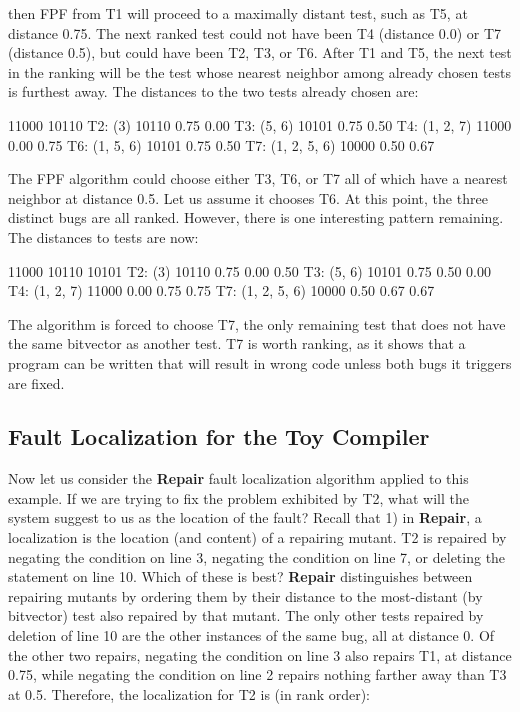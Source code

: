 \noindent then FPF from T1 will proceed to a maximally distant
test, such as T5, at distance 0.75.  The next ranked test could not have
been T4 (distance 0.0) or T7 (distance 0.5), but could have
been T2, T3, or T6.  After T1 and T5, the next test in the ranking will be the test whose nearest
neighbor among already chosen tests is furthest away.  The distances
to the two tests already chosen are:

\begin{code}
                         11000  10110
T2: (3)          10110   0.75   0.00
T3: (5, 6)       10101   0.75   0.50
T4: (1, 2, 7)    11000   0.00   0.75
T6: (1, 5, 6)    10101   0.75   0.50
T7: (1, 2, 5, 6) 10000   0.50   0.67
\end{code}

\noindent The FPF algorithm could choose either T3, T6, or T7 all of
which have a nearest neighbor at distance 0.5.  Let
us assume it chooses T6.  At this point, the three distinct bugs
are all ranked.  However, there is one interesting pattern remaining.
The distances to tests are now:

\begin{code}
                         11000  10110  10101
T2: (3)          10110   0.75   0.00   0.50
T3: (5, 6)       10101   0.75   0.50   0.00
T4: (1, 2, 7)    11000   0.00   0.75   0.75
T7: (1, 2, 5, 6) 10000   0.50   0.67   0.67
\end{code}

\noindent The algorithm is forced to choose T7, the only remaining
test that does not have the same bitvector as another test.  T7 is
worth ranking, as it shows that a program can be written that will
result in wrong code unless both bugs it triggers are fixed.

\subsection{Fault Localization for the Toy Compiler}

Now let us consider the {\bf Repair} fault localization algorithm
applied to this example.  If we are trying to fix the problem
exhibited by T2, what will the system suggest to us as the
location of the fault?  Recall that 1) in {\bf Repair}, a localization
is the location (and content) of a repairing mutant.  T2 is repaired
by negating the condition on line 3, negating the condition on line 7,
or deleting the statement on line 10.  Which of these is best?  {\bf
  Repair} distinguishes between repairing mutants by ordering them by
their distance to the most-distant (by bitvector) test also repaired
by that mutant.  The only other tests repaired by deletion of line 10
are the other instances of the same bug, all at distance 0.  Of the
other two repairs, negating the condition on line 3 also repairs T1,
at distance 0.75, while negating the condition on line 2 repairs
nothing farther away than T3 at 0.5.
Therefore, the localization for T2 is (in rank order):

